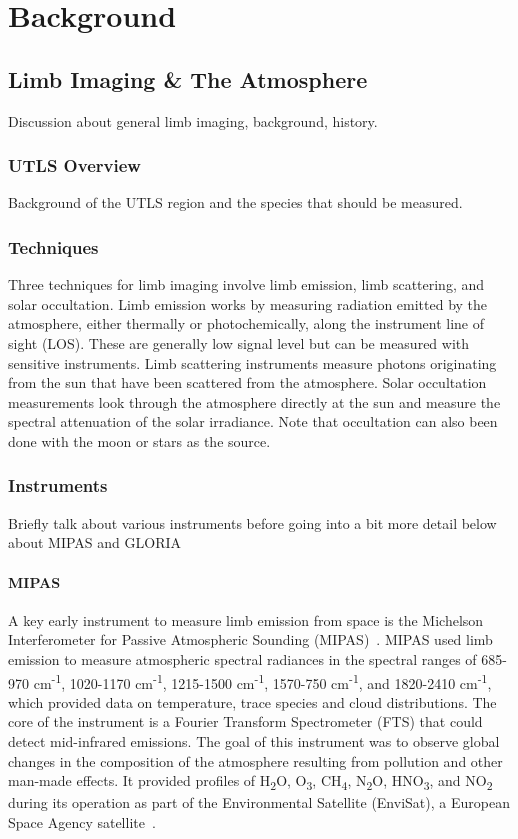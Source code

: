 \chapter{Background} \label{bkgnd}

\section{Limb Imaging \& The Atmosphere}
Discussion about general limb imaging, background, history.

\subsection{UTLS Overview}
Background of the UTLS region and the species that should be measured.

\subsection{Techniques}
Three techniques for limb imaging involve limb emission, limb scattering, and solar occultation. Limb emission works by measuring radiation emitted by the atmosphere, either thermally or photochemically, along the instrument line of sight (LOS). These are generally low signal level but can be measured with sensitive instruments. Limb scattering instruments measure photons originating from the sun that have been scattered from the atmosphere.   Solar occultation measurements look through the atmosphere directly at the sun and measure the spectral attenuation of the solar irradiance. Note that occultation can also been done with the moon or stars as the source.

\subsection{Instruments}
Briefly talk about various instruments before going into a bit more detail below about MIPAS and GLORIA

\subsubsection{MIPAS}
A key early instrument to measure limb emission from space is the Michelson Interferometer for Passive Atmospheric Sounding (MIPAS)~\cite{MIPAS_instrument}. MIPAS used limb emission to measure atmospheric spectral radiances in the spectral ranges of 685-970 cm\textsuperscript{-1}, 1020-1170 cm\textsuperscript{-1}, 1215-1500 cm\textsuperscript{-1}, 1570-750 cm\textsuperscript{-1}, and 1820-2410 cm\textsuperscript{-1}, which provided data on temperature, trace species and cloud distributions. The core of the instrument is a Fourier Transform Spectrometer (FTS) that could detect mid-infrared emissions. The goal of this instrument was to observe global changes in the composition of the atmosphere resulting from pollution and other man-made effects. It provided profiles of H\textsubscript{2}O, O\textsubscript{3}, CH\textsubscript{4}, N\textsubscript{2}O, HNO\textsubscript{3}, and NO\textsubscript{2} during its operation as part of the Environmental Satellite (EnviSat), a European Space Agency satellite~\cite{MIPAS_instrument}.

